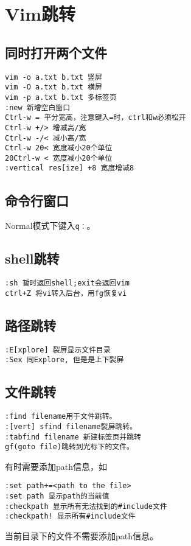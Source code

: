 
\section{Vim跳转}

\subsection{同时打开两个文件}
\begin{verbatim}
vim -o a.txt b.txt 竖屏
vim -O a.txt b.txt 横屏
vim -p a.txt b.txt 多标签页
:new 新增空白窗口
Ctrl-w = 平分宽高，注意键入=时，ctrl和w必须松开
Ctrl-w +/> 增减高/宽
Ctrl-w -/< 减小高/宽
Ctrl-w 20< 宽度减小20个单位
20Ctrl-w < 宽度减小20个单位
:vertical res[ize] +8 宽度增减8
\end{verbatim}

\subsection{命令行窗口}
Normal模式下键入\verb+q：+。

\subsection{shell跳转}
\begin{verbatim}
:sh 暂时返回shell;exit会返回vim
ctrl+Z 将vi转入后台，用fg恢复vi
\end{verbatim}

\subsection{路径跳转}
\begin{verbatim}
:E[xplore] 裂屏显示文件目录
:Sex 同Explore, 但是是上下裂屏
\end{verbatim}

\subsection{文件跳转}
\begin{verbatim}
:find filename用于文件跳转。
:[vert] sfind filename裂屏跳转。
:tabfind filename 新建标签页并跳转
gf(goto file)跳转到光标下的文件。
\end{verbatim}

有时需要添加path信息，如
\begin{verbatim}
:set path+=<path to the file>
:set path 显示path的当前值
:checkpath 显示所有无法找到的#include文件
:checkpath! 显示所有#include文件
\end{verbatim}
当前目录下的文件不需要添加path信息。

